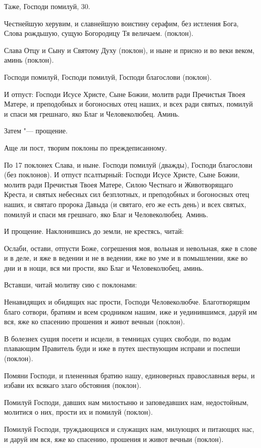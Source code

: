Таже, Господи помилуй, 30. 

Честнейшую херувим, и славнейшую воистину серафим, без истления Бога, Слова рождьшую, сущую Богородицу Тя величаем. (поклон).

Слава Отцу и Сыну и Святому Духу (поклон), и ныне и присно и во веки веком, аминь (поклон).

Господи помилуй, Господи помилуй, Господи благослови (поклон).

И отпуст: Господи Исусе Христе, Сыне Божии, молитв ради Пречистыя Твоея Матере, и преподобных и богоносных отец наших, и всех ради святых, помилуй и спаси мя грешнаго, яко Благ и Человеколюбец. Аминь.

Затем "--- прощение.

Аще ли пост, творим поклоны по преждеписанному.

По 17 поклонех Слава, и ныне. Господи помилуй (дважды), Господи благослови (без поклонов). И отпуст псалтырный: Господи Исусе Христе, Сыне Божии, молитв ради Пречистыя Твоея Матере, Силою Честнаго и Животворящаго Креста, и святых небесных сил безплотных, и преподобных и богоносных отец наших, и святаго пророка Давыда (и святаго, его же есть день) и всех святых, помилуй и спаси мя грешнаго, яко Благ и Человеколюбец. Аминь.

И прощение. Наклонившись до земли, не крестясь, читай:

Ослаби, остави, отпусти Боже, согрешения моя, вольная и невольная, яже в слове и в деле, и яже в ведении и не в ведении, яже во уме и в помышлении, яже во дни и в нощи, вся ми прости, яко Благ и Человеколюбец, аминь.

Вставши, читай молитву сию с поклонами:

Ненавидящих и обидящих нас прости, Господи Человеколюбче. Благотворящим благо сотвори, братиям и всем сродником нашим, иже и уединившимся, даруй им вся, яже ко спасению прошения и живот вечныи (поклон).

В болезнех сущия посети и исцели, в темницах сущих свободи, по водам плавающим Правитель буди и иже в путех шествующим исправи и поспеши (поклон).

Помяни Господи, и плененныя братию нашу, единоверных православныя веры, и избави их всякаго злаго обстояния (поклон).

Помилуй Господи, давших нам милостыню и заповедавших нам, недостойным, молитися о них, прости их и помилуй (поклон).

Помилуй Господи, труждающихся и служащих нам, милующих и питающих нас, и даруй им вся, яже ко спасению, прошения и живот вечныи (поклон).

